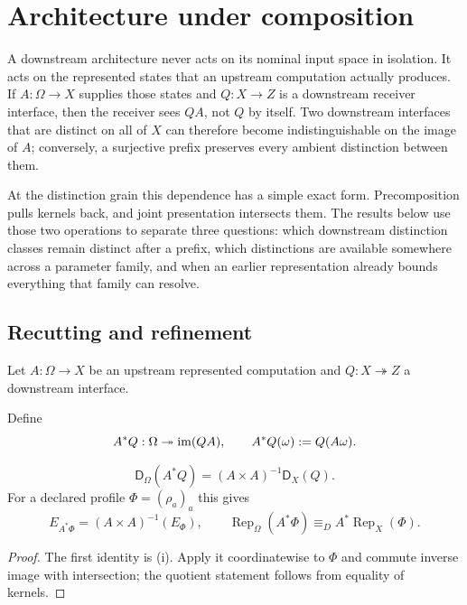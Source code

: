 \section{Architecture under composition}\label{sec:composition}

A downstream architecture never acts on its nominal input space in isolation. It acts on the represented states that an upstream computation actually produces. If $A:\Omega\to X$ supplies those states and $Q:X\to Z$ is a downstream receiver interface, then the receiver sees $QA$, not $Q$ by itself. Two downstream interfaces that are distinct on all of $X$ can therefore become indistinguishable on the image of $A$; conversely, a surjective prefix preserves every ambient distinction between them.

At the distinction grain this dependence has a simple exact form. Precomposition pulls kernels back, and joint presentation intersects them. The results below use those two operations to separate three questions: which downstream distinction classes remain distinct after a prefix, which distinctions are available somewhere across a parameter family, and when an earlier representation already bounds everything that family can resolve.

\subsection{Recutting and refinement}

Let $A:\Omega\to X$ be an upstream represented computation and $Q:X\twoheadrightarrow Z$ a downstream interface.

\begin{definition}\label{def:recut-interface-v13}
Define
\[
A^*Q:\Omega\twoheadrightarrow\operatorname{im}(QA),
\qquad
A^*Q(\omega):=Q(A\omega).
\]
\end{definition}

\begin{theorem}\label{thm:recutting-v13}
\[
\boxed{
\mathsf D_\Omega(A^*Q)
=(A\times A)^{-1}\mathsf D_X(Q).
}
\]
For a declared profile $\Phi=(\rho_a)_a$ this gives
\[
E_{A^*\Phi}=(A\times A)^{-1}(E_\Phi),
\qquad
\operatorname{Rep}_\Omega(A^*\Phi)
\equiv_D
A^*\operatorname{Rep}_X(\Phi).
\]
\end{theorem}

\begin{proof}
The first identity is (i). Apply it coordinatewise to $\Phi$ and commute inverse image with intersection; the quotient statement follows from equality of kernels.
\end{proof}

